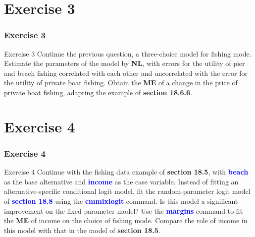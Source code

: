 \documentclass[11pt, aspectratio=169]{beamer}
\begin{document}
	\section{Exercise 3}
		\begin{frame}
			\frametitle{Exercise 3}
			\begin{block}{Exercise 3}
				Continue the previous question, a three-choice model for fishing mode.
				Estimate the parameters of the model by \textbf{NL}, with errors for the utility
				of pier and beach fishing correlated with each other and uncorrelated
				with the error for the utility of private boat fishing. Obtain the \textbf{ME} of a
				change in the price of private boat fishing, adapting the example of
				\textcolor{red!50}{\textbf{section 18.6.6}}.
			\end{block}
		\end{frame}
	\section{Exercise 4}
		\begin{frame}
			\frametitle{Exercise 4}
			\begin{block}{Exercise 4}
				Continue with the fishing data example of \textcolor{red!50}{\textbf{section 18.5}}, with \textcolor{blue}{\textbf{beach}} as
				the base alternative and \textcolor{blue}{\textbf{income}} as the case variable. Instead of fitting
				an alternative-specific conditional logit model, fit the random-parameter logit model of \textcolor{blue}{\textbf{section 18.8}} using the \textcolor{blue}{\textbf{cmmixlogit}} command.
				Is this model a significant improvement on the fixed parameter model?
				Use the \textcolor{blue}{\textbf{margins}} command to fit the \textbf{ME} of income on the choice of
				fishing mode. Compare the role of income in this model with that in
				the model of \textcolor{red!50}{\textbf{section 18.5}}.
			\end{block}
		\end{frame}
\end{document}
